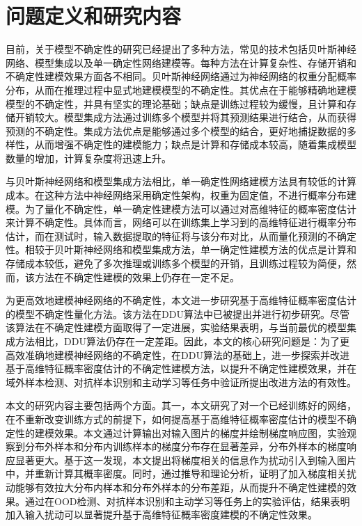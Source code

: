 \section{问题定义和研究内容}
目前，关于模型不确定性的研究已经提出了多种方法，常见的技术包括贝叶斯神经网络、模型集成以及单一确定性网络建模等。每种方法在计算复杂性、存储开销和不确定性建模效果方面各不相同。贝叶斯神经网络通过为神经网络的权重分配概率分布，从而在推理过程中显式地建模模型的不确定性。其优点在于能够精确地建模模型的不确定性，并具有坚实的理论基础；缺点是训练过程较为缓慢，且计算和存储开销较大。模型集成方法通过训练多个模型并将其预测结果进行结合，从而获得预测的不确定性。集成方法优点是能够通过多个模型的结合，更好地捕捉数据的多样性，从而增强不确定性的建模能力；缺点是计算和存储成本较高，随着集成模型数量的增加，计算复杂度将迅速上升。

与贝叶斯神经网络和模型集成方法相比，单一确定性网络建模方法具有较低的计算成本。在这种方法中神经网络采用确定性架构，权重为固定值，不进行概率分布建模。为了量化不确定性，单一确定性建模方法可以通过对高维特征的概率密度估计来计算不确定性。具体而言，网络可以在训练集上学习到的高维特征进行概率分布估计，而在测试时，输入数据提取的特征将与该分布对比，从而量化预测的不确定性。相较于贝叶斯神经网络和模型集成方法，单一确定性建模方法的优点是计算和存储成本较低，避免了多次推理或训练多个模型的开销，且训练过程较为简便，然而，该方法在不确定性建模的效果上仍存在一定不足。

为更高效地建模神经网络的不确定性，本文进一步研究基于高维特征概率密度估计的模型不确定性量化方法。该方法在DDU算法\cite{Mukhoti_2023_CVPR}中已被提出并进行初步研究。尽管该算法在不确定性建模方面取得了一定进展，实验结果表明，与当前最优的模型集成方法相比，DDU算法仍存在一定差距。因此，本文的核心研究问题是：为了更高效准确地建模神经网络的不确定性，在DDU算法的基础上，进一步探索并改进基于高维特征概率密度估计的不确定性建模方法，以提升不确定性建模效果，并在域外样本检测、对抗样本识别和主动学习等任务中验证所提出改进方法的有效性。

本文的研究内容主要包括两个方面。其一，本文研究了对一个已经训练好的网络，在不重新改变训练方式的前提下，如何提高基于高维特征概率密度估计的模型不确定性的建模效果。本文通过计算输出对输入图片的梯度并绘制梯度响应图，实验观察到分布外样本和分布内训练样本的梯度分布存在显著差异，分布外样本的梯度响应显著更大。基于这一发现，本文提出将梯度相关的信息作为扰动引入到输入图片中，并重新计算其概率密度。同时，通过推导和理论分析，证明了加入梯度相关扰动能够有效拉大分布内样本和分布外样本的分布差距，从而提升不确定性建模的效果。通过在OOD检测、对抗样本识别和主动学习等任务上的实验评估，结果表明加入输入扰动可以显著提升基于高维特征概率密度建模的不确定性效果。

